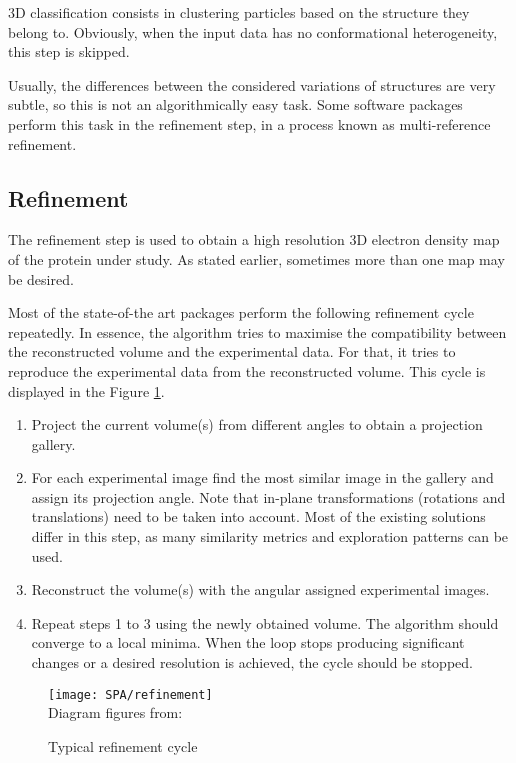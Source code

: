 \documentclass[../main.tex]{subfiles}
\begin{document}
3D classification consists in clustering particles based on the structure they belong to. Obviously, when the input data has no conformational heterogeneity, this step is skipped.

Usually, the differences between the considered variations of structures are very subtle, so this is not an algorithmically easy task. Some software packages perform this task in the refinement step, in a process known as multi-reference refinement.

\subsection{Refinement}
The refinement step is used to obtain a high resolution 3D electron density map of the protein under study. As stated earlier, sometimes more than one map may be desired. 

Most of the state-of-the art packages perform the following refinement cycle repeatedly. In essence, the algorithm tries to maximise the compatibility between the reconstructed volume and the experimental data. For that, it tries to reproduce the experimental data from the reconstructed volume. This cycle is displayed in the Figure \ref{fig:2:refinement}.

\begin{enumerate}
    \item Project the current volume(s) from different angles to obtain a projection gallery.
    \item For each experimental image find the most similar image in the gallery and assign its projection angle. Note that in-plane transformations (rotations and translations) need to be taken into account. Most of the existing solutions differ in this step, as many similarity metrics and exploration patterns can be used.
    \item Reconstruct the volume(s) with the angular assigned experimental images.
    \item Repeat steps 1 to 3 using the newly obtained volume. The algorithm should converge to a local minima\cite{sigworth2015}. When the loop stops producing significant changes or a desired resolution is achieved, the cycle should be stopped.
\end{enumerate}

\begin{figure}[htbp]
    \centering
    \texttt{[image: SPA/refinement]}\\
    Diagram figures from: \cite{nogales2015}
    \caption{Typical refinement cycle}
    \label{fig:2:refinement}
\end{figure}
\end{document}
